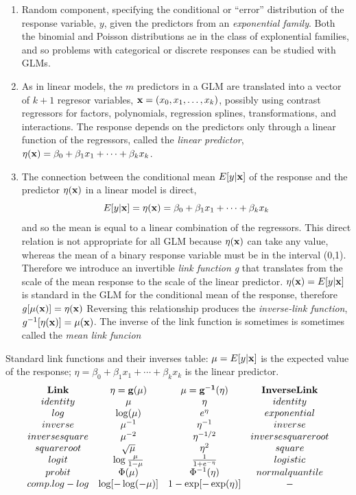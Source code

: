 \documentclass[
]{article}
\begin{document}
\begin{enumerate}
\def\labelenumi{\arabic{enumi}.}
\item
  Random component, specifying the conditional or ``error'' distribution
  of the response variable, \(y\), given the predictors from an
  \emph{exponential family}. Both the binomial and Poisson distributions
  ae in the class of explonential families, and so problems with
  categorical or discrete responses can be studied with GLMs.
\item
  As in linear models, the \(m\) predictors in a GLM are translated into
  a vector of \(k + 1\) regresor variables,
  \({\bf x} = (x_0, x_1, \dots , x_k)\), possibly using contrast
  regressors for factors, polynomials, regression splines,
  transformations, and interactions. The response depends on the
  predictors only through a linear function of the regressors, called
  the \emph{linear predictor},
  \(\eta({\bf x}) = \beta_0 + \beta_1 x_1 + \cdots + \beta_k x_k\).
\item
  The connection between the conditional mean \(E[y|{\bf x}]\) of the
  response and the predictor \(\eta({\bf x})\) in a linear model is
  direct,
  \[E[y|{\bf x}] = \eta({\bf x}) = \beta_0 + \beta_1 x_1 + \cdots + \beta_k x_k\]
  and so the mean is equal to a linear combination of the regressors.
  This direct relation is not appropriate for all GLM because
  \(\eta({\bf x})\) can take any value, whereas the mean of a binary
  response variable must be in the interval (0,1). Therefore we
  introduce an invertible \emph{link function g} that translates from
  the scale of the mean response to the scale of the linear predictor.
  \(\eta({\bf x}) = E[y|{\bf x}]\) is standard in the GLM for the
  conditional mean of the response, therefore
  \(g[\mu({\bf x})] = \eta({\bf x})\) Reversing this relationship
  produces the \emph{inverse-link function},
  \(g^{-1}[\eta(\bf {x})] = \mu(\bf {x})\). The inverse of the link
  function is sometimes is sometimes called the \emph{mean link funcion}
\end{enumerate}

Standard link functions and their inverses table: \(\mu = E[y|\bf x]\)
is the expected value of the response;
\(\eta = \beta_0 + \beta_1 x_1 + \cdots + \beta_k x_k\) is the linear
predictor. \[\begin{array}{cccc}
  \bf Link & {\bf  \eta = g(\mu)} & {\bf \mu = g^{-1}(\eta)} & \bf Inverse Link \\
  identity & \mu & \eta & identity \\
  log  & \log(\mu) & e^\eta & exponential  \\
  inverse & \mu^{-1} & \eta^{-1} & inverse  \\
  inverse square & \mu^{-2} & \eta^{-1/2} & inverse square root  \\
  square root & \sqrt{\mu} & \eta^{2} & square \\
  logit & \log\frac{\mu}{1-\mu} & \frac{1}{1+e^{-\eta}} & logistic \\
  probit & \Phi(\mu) & \Phi^{-1}(\eta) & normal quantile \\
  comp. log-log & \log[-\log(-\mu)] & 1- \exp[-\exp(\eta)] & -
\end{array} \]
\end{document}
